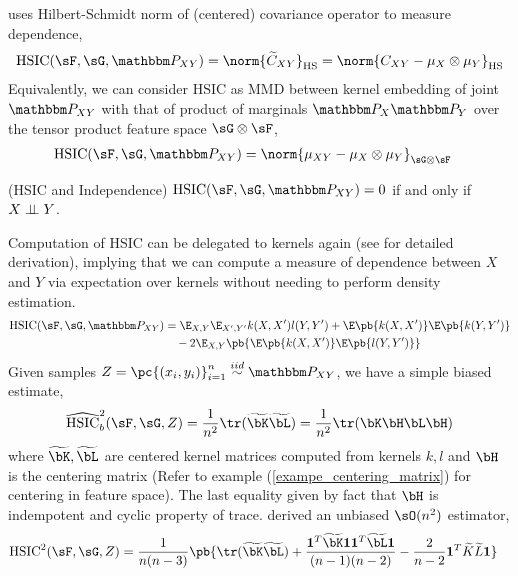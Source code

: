 \documentclass[11pt]{article}
\begin{document}
\cite{grettonMeasuringStatisticalDependence2005} uses Hilbert-Schmidt norm of (centered) covariance operator to measure dependence,
\begin{align}
    \text{HSIC}(\sF,\sG,\bbP_{XY})
        = \norm{\widetilde{C}_{XY}}_{\text{HS}}
        = \norm{ C_{XY} - \mu_X \otimes \mu_{Y} }_{\text{HS}}
\end{align}
Equivalently, we can consider $\text{HSIC}$ as MMD between kernel embedding of joint $\bbP_{XY}$ with that of product of marginals $\bbP_X\bbP_Y$ over the tensor product feature space $\sG\otimes\sF$,
\begin{align}
    \text{HSIC}(\sF,\sG,\bbP_{XY})
        &= \norm{ \mu_{XY} - \mu_{X} \otimes \mu_{Y} }_{\sG\otimes\sF}
\end{align} 

\begin{proposition}
    (HSIC and Independence) $\text{HSIC}(\sF,\sG,\bbP_{XY})=0$ if and only if $X\perp\!\!\!\perp Y$.
\end{proposition}

Computation of HSIC can be delegated to kernels again (see \cite{grettonNotesMeanEmbeddings2019} for detailed derivation), implying that we can compute a measure of dependence between $X$ and $Y$ via expectation over kernels without needing to perform density estimation. 
\begin{align}
    \text{HSIC}(\sF,\sG,\bbP_{XY})
        &= \E_{X,Y} \E_{X',Y'} k(X,X')l(Y,Y')
            + \E\pb{k(X,X')}\E\pb{k(Y,Y')} \\ 
        &\quad -2 \E_{X,Y} \pb{ \E\pb{k(X,X')} \E\pb{l(Y,Y')} }
\end{align}
Given samples $Z = \pc{(x_i,y_i)}_{i=1}^n \overset{iid}{\sim} \bbP_{XY}$, we have a simple biased estimate,
\begin{align}
    \widehat{\text{HSIC}}_b^2(\sF,\sG,Z)
        = \frac{1}{n^2} \tr(\widetilde{\bK}\widetilde{\bL})
        = \frac{1}{n^2} \tr(\bK\bH\bL\bH)
\end{align}
where $\widetilde{\bK},\widetilde{\bL}$ are centered kernel matrices computed from kernels $k,l$ and $\bH$ is the centering matrix (Refer to example (\ref{exampe_centering_matrix}) for centering in feature space). The last equality given by fact that $\bH$ is indempotent and cyclic property of trace. \cite{songFeatureSelectionDependence2012a} derived an unbiased $\sO(n^2)$ estimator,
\begin{align}
    \text{HSIC}^2(\sF,\sG,Z)
        &= \frac{1}{n(n-3)} \pb{
            \tr(\widetilde{\bK}\widetilde{\bL}) + 
            \frac{ \mathbf{1}^T \widetilde{\bK} \mathbf{1} \mathbf{1}^T \widetilde{\bL} \mathbf{1} }{ (n-1)(n-2) } -
            \frac{2}{n-2} \mathbf{1}^T \widetilde{K}\widetilde{L}\mathbf{1} 
        }
\end{align}
\end{document}
